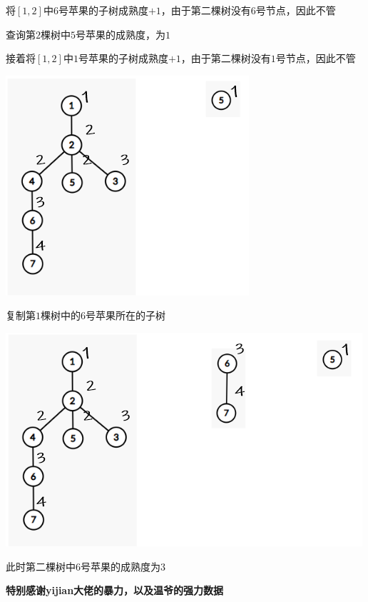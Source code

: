 \documentclass[12pt]{article}
\begin{document}
    将$[1,2]$中$6$号苹果的子树成熟度$+1$，由于第二棵树没有$6$号节点，因此不管\par
    查询第$2$棵树中$5$号苹果的成熟度，为$1$\par
    接着将$[1,2]$中$1$号苹果的子树成熟度$+1$，由于第二棵树没有$1$号节点，因此不管\par
    \centerline{\includegraphics{hint4.png}}\par
    复制第$1$棵树中的$6$号苹果所在的子树\par
    \centerline{\includegraphics{hint5.png}}\par 
    此时第二棵树中$6$号苹果的成熟度为$3$\par
    \textbf{特别感谢yijian大佬的暴力，以及温爷的强力数据}
\end{document}
